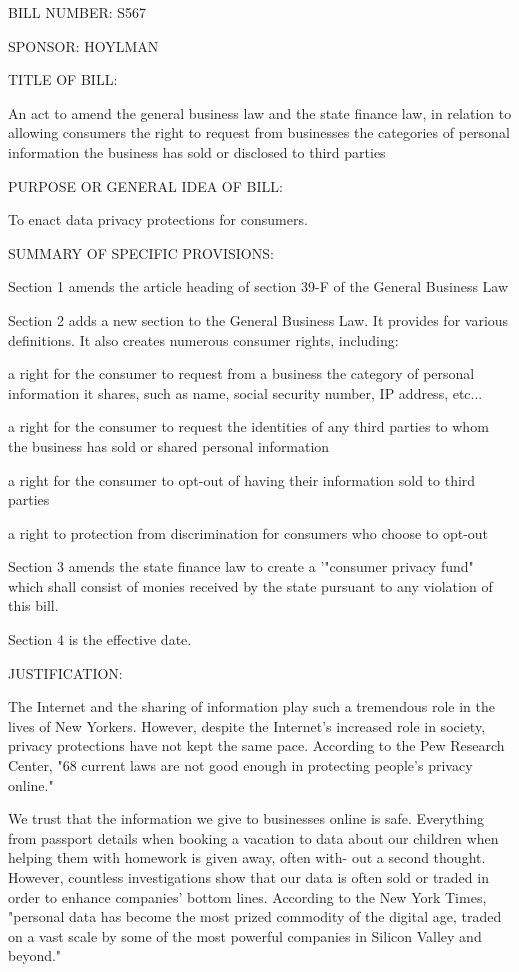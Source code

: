 BILL NUMBER: S567

SPONSOR: HOYLMAN
 
TITLE OF BILL:

An act to amend the general business law and the state finance law, in
relation to allowing consumers the right to request from businesses the
categories of personal information the business has sold or disclosed to
third parties

 
PURPOSE OR GENERAL IDEA OF BILL:

To enact data privacy protections for consumers.

 
SUMMARY OF SPECIFIC PROVISIONS:

Section 1 amends the article heading of section 39-F of the General
Business Law

Section 2 adds a new section to the General Business Law. It provides
for various definitions. It also creates numerous consumer rights,
including:

a right for the consumer to request from a business the category of
personal information it shares, such as name, social security number, IP
address, etc...

a right for the consumer to request the identities of any third parties
to whom the business has sold or shared personal information

a right for the consumer to opt-out of having their information sold to
third parties

a right to protection from discrimination for consumers who choose to
opt-out

Section 3 amends the state finance law to create a '"consumer privacy
fund" which shall consist of monies received by the state pursuant to
any violation of this bill.

Section 4 is the effective date.

 
JUSTIFICATION:

The Internet and the sharing of information play such a tremendous role
in the lives of New Yorkers. However, despite the Internet's increased
role in society, privacy protections have not kept the same pace.
According to the Pew Research Center, "68%
current laws are not good enough in protecting people's privacy online."

We trust that the information we give to businesses online is safe.
Everything from passport details when booking a vacation to data about
our children when helping them with homework is given away, often with-
out a second thought. However, countless investigations show that our
data is often sold or traded in order to enhance companies' bottom
lines. According to the New York Times, "personal data has become the
most prized commodity of the digital age, traded on a vast scale by some
of the most powerful companies in Silicon Valley and beyond."

